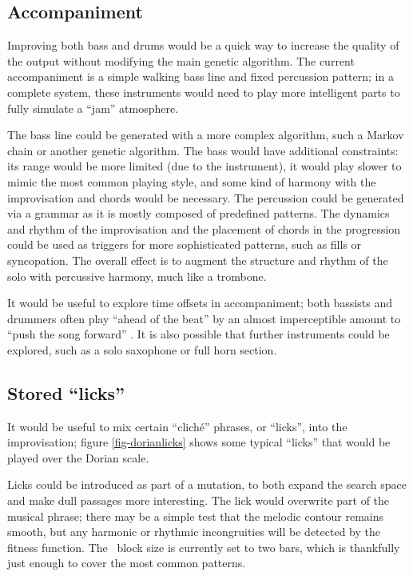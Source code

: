 \subsection{Accompaniment}

Improving both bass and drums would be a quick way to increase the quality of the output without modifying the main genetic algorithm. The current accompaniment is a simple walking bass line and fixed percussion pattern; in a complete system, these instruments would need to play more intelligent parts to fully simulate a ``jam'' atmosphere.

The bass line could be generated with a more complex algorithm, such a Markov chain \citep{mcalpine99} or another genetic algorithm. The bass would have additional constraints: its range would be more limited (due to the instrument), it would play slower to mimic the most common playing style, and some kind of harmony with the improvisation and chords would be necessary. The percussion could be generated via a grammar \citep{mccormack96} as it is mostly composed of predefined patterns. The dynamics and rhythm of the improvisation and the placement of chords in the progression could be used as triggers for more sophisticated patterns, such as fills or syncopation. The overall effect is to augment the structure and rhythm of the solo with percussive harmony, much like a trombone.

It would be useful to explore time offsets in accompaniment; both bassists and drummers often play ``ahead of the beat'' by an almost imperceptible amount to ``push the song forward'' \citep{sabatella95}. It is also possible that further instruments could be explored, such as a solo saxophone or full horn section.

\subsection{Stored ``licks''}

It would be useful to mix certain ``clich\'{e}'' phrases, or ``licks'', into the improvisation; figure \ref{fig-dorianlicks} shows some typical ``licks'' that would be played over the Dorian scale.


Licks could be introduced as part of a mutation, to both expand the search space and make dull passages more interesting. The lick would overwrite part of the musical phrase; there may be a simple test that the melodic contour remains smooth, but any harmonic or rhythmic incongruities will be detected by the fitness function. The \jg\ block size is currently set to two bars, which is thankfully just enough to cover the most common patterns.

